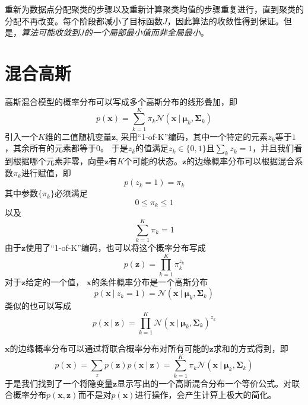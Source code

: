 \documentclass[11pt]{ctexbook}
\begin{document}
重新为数据点分配聚类的步骤以及重新计算聚类均值的步骤重复进行，直到聚类的分配不再改变。每个阶段都减小了目标函数$J$，因此算法的收敛性得到保证。但是，\emph{算法可能收敛到$J$的一个局部最小值而非全局最小}。

\section{混合高斯}
高斯混合模型的概率分布可以写成多个高斯分布的线形叠加，即
\begin{equation}
	p(\bm x) = \sum_{k=1}^{K}\pi_k\mathcal N(\bm x\ | \ \bm \mu_k, \bm \Sigma_k)
\end{equation}
引入一个$K$维的二值随机变量$\bm z$, 采用“1-of-K”编码，其中一个特定的元素$z_k$等于$1$，其余所有的元素都等于$0$。 于是$z_k$的值满足$z_k \in \{0, 1\}$且$\sum_k z_k = 1$，并且我们看到根据哪个元素非零，向量$\bm z$有$K$个可能的状态。$\bm z$的边缘概率分布可以根据混合系数$\pi_k$进行赋值，即
\begin{equation}
	p(z_k=1) = \pi_k
\end{equation}
其中参数$\{\pi_k\}$必须满足
\begin{equation}
	0 \leqslant \pi_k \leqslant 1
\end{equation}
以及
\begin{equation}
	\sum_{k=1}^{K} \pi_k = 1
\end{equation}
由于$\bm z$使用了“1-of-K”编码，也可以将这个概率分布写成
\begin{equation}
	p(\bm z) = \prod_{k=1}^{K}\pi_k^{z_k}
\end{equation}
对于$\bm z$给定的一个值， $\bm x$的条件概率分布是一个高斯分布
\begin{equation}
	p(\bm x\ |\  z_k= 1) = \mathcal N (\bm x\ |\ \bm \mu_k, \bm \Sigma_k )
\end{equation}
类似的也可以写成
\begin{equation}
	p(\bm x \ | \ \bm z) = \prod_{k=1}^{K} \mathcal N (\bm x \ |\ \bm \mu_k, \bm \Sigma_k ) ^ {z_k}
\end{equation}

$\bm x $的边缘概率分布可以通过将联合概率分布对所有可能的$\bm z$求和的方式得到，即
\begin{equation}
	p(\bm x) = \sum_z p(\bm z)p(\bm x \ |\ \bm z) = \sum_{k=1}^{K}\pi_k \mathcal N(\bm x \ |\ \bm \mu_k, \bm \Sigma_k)
\end{equation}
于是我们找到了一个将隐变量$\bm z$显示写出的一个高斯混合分布一个等价公式。对联合概率分布$p(\bm x, \bm z)$而不是对$p(\bm x)$进行操作，会产生计算上极大的简化。
\end{document}
